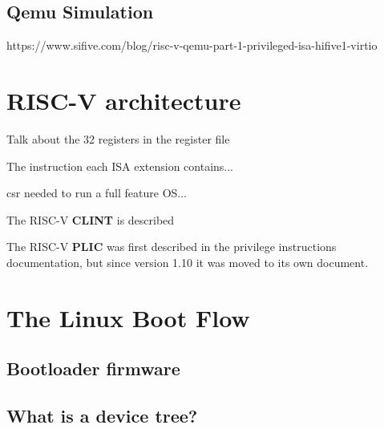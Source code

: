 \subsection{Qemu Simulation}
https://www.sifive.com/blog/risc-v-qemu-part-1-privileged-isa-hifive1-virtio

\section{RISC-V architecture}
Talk about the 32 registers in the register file

The instruction each ISA extension contains...

\acrfull{csr} needed to run a full feature OS...

The RISC-V \textbf{CLINT} is described

The RISC-V \textbf{PLIC} was first described in the privilege instructions documentation, but since version 1.10 it was moved to its own document.

\section{The Linux Boot Flow}
\subsection{Bootloader firmware}
\subsection{What is a device tree?}


